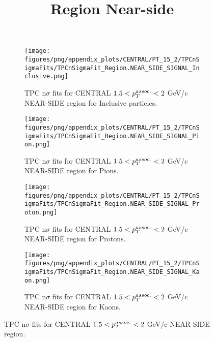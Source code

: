             \begin{figure}[H]
                \title{Region Near-side}
                \begin{subfigure}[b]{0.5\textwidth}
                    \centering
                    \texttt{[image: figures/png/appendix\_plots/CENTRAL/PT\_15\_2/TPCnSigmaFits/TPCnSigmaFit\_Region.NEAR\_SIDE\_SIGNAL\_Inclusive.png]}
                    \caption{TPC n$\sigma$ fits for CENTRAL $1.5 < \pTassoc < 2$ GeV/c NEAR-SIDE region for Inclusive particles.}
                    \label{fig:appendix_CENTRAL_$1.5 < \pTassoc < 2$ GeV/c_NEAR_SIDE_SIGNAL_Inclusive}
                \end{subfigure}
                \begin{subfigure}[b]{0.5\textwidth}
                    \centering
                    \texttt{[image: figures/png/appendix\_plots/CENTRAL/PT\_15\_2/TPCnSigmaFits/TPCnSigmaFit\_Region.NEAR\_SIDE\_SIGNAL\_Pion.png]}
                    \caption{TPC n$\sigma$ fits for CENTRAL $1.5 < \pTassoc < 2$ GeV/c NEAR-SIDE region for Pions.}
                    \label{fig:appendix_CENTRAL_$1.5 < \pTassoc < 2$ GeV/c_NEAR_SIDE_SIGNAL_Pion}
                \end{subfigure}
                \begin{subfigure}[b]{0.5\textwidth}
                    \centering
                    \texttt{[image: figures/png/appendix\_plots/CENTRAL/PT\_15\_2/TPCnSigmaFits/TPCnSigmaFit\_Region.NEAR\_SIDE\_SIGNAL\_Proton.png]}
                    \caption{TPC n$\sigma$ fits for CENTRAL $1.5 < \pTassoc < 2$ GeV/c NEAR-SIDE region for Protons.}
                    \label{fig:appendix_CENTRAL_$1.5 < \pTassoc < 2$ GeV/c_NEAR_SIDE_SIGNAL_Proton}
                \end{subfigure}
                \begin{subfigure}[b]{0.5\textwidth}
                    \centering
                    \texttt{[image: figures/png/appendix\_plots/CENTRAL/PT\_15\_2/TPCnSigmaFits/TPCnSigmaFit\_Region.NEAR\_SIDE\_SIGNAL\_Kaon.png]}
                    \caption{TPC n$\sigma$ fits for CENTRAL $1.5 < \pTassoc < 2$ GeV/c NEAR-SIDE region for Kaons.}
                    \label{fig:appendix_CENTRAL_$1.5 < \pTassoc < 2$ GeV/c_NEAR_SIDE_SIGNAL_Kaon}
                \end{subfigure}
                \caption{TPC n$\sigma$ fits for CENTRAL $1.5 < \pTassoc < 2$ GeV/c NEAR-SIDE region.}
                \label{fig:appendix_CENTRAL_$1.5 < \pTassoc < 2$ GeV/c_NEAR_SIDE_SIGNAL}
            \end{figure}
